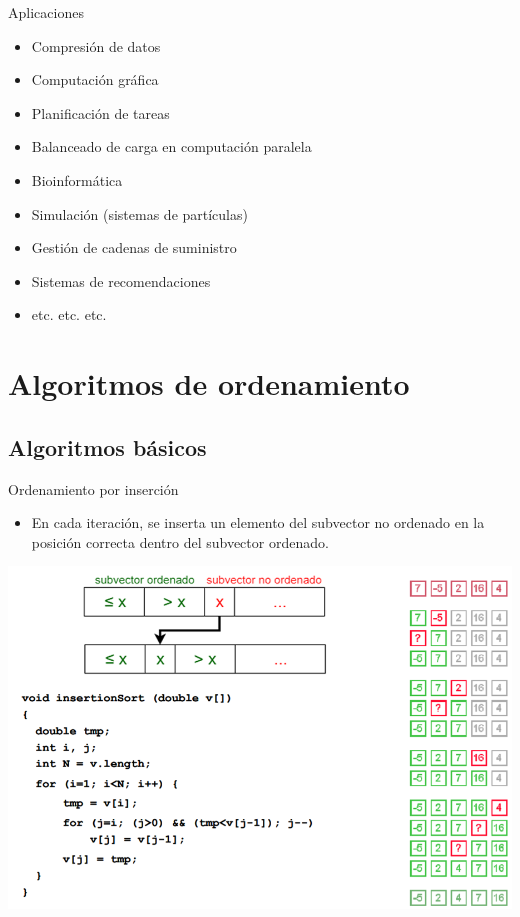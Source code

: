 \documentclass{beamer} %
\begin{document}
\begin{frame}{Aplicaciones}
    \begin{itemize}
        \item Compresión de datos
        \item Computación gráfica
        \item Planificación de tareas
        \item Balanceado de carga en computación paralela
        \item Bioinformática
        \item Simulación (sistemas de partículas)
        \item Gestión de cadenas de suministro
        \item Sistemas de recomendaciones
        \item etc. etc. etc.
    \end{itemize}
\end{frame}

\section{Algoritmos de ordenamiento}

\subsection{Algoritmos básicos}

\begin{frame}{Ordenamiento por inserción}
    \begin{itemize}
        \item {\footnotesize En cada iteración, se inserta un elemento del subvector no ordenado en la posición correcta dentro del subvector ordenado.}
    \end{itemize}
    \begin{center}
        \includegraphics[width=.8\textwidth]{./image/cap5/insertion-sort.png}
    \end{center}
\end{frame}
\end{document}
